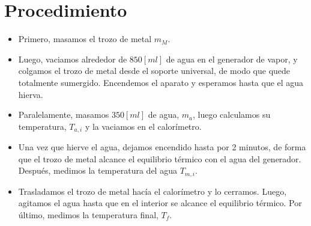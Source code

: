 \documentclass[a4paper, 12p]{article}
\begin{document}
\section{Procedimiento}

\begin{itemize}
      \item Primero, masamos el trozo de metal $m_M$.
      \item Luego, vaciamos alrededor de $850 [ml]$ de agua en el generador de vapor, y colgamos el trozo de metal desde el soporte universal,
      de modo que quede totalmente sumergido. Encendemos el aparato y esperamos hasta que el agua hierva.
      \item Paralelamente, masamos $350 [ml]$ de agua, $m_a$, luego calculamos su temperatura, $T_{a,i}$ y la vaciamos en el calorímetro. 
      \item Una vez que hierve el agua, dejamos encendido hasta por 2 minutos, de forma que el trozo de metal alcance el 
      equilibrio térmico con el agua del generador. Después, medimos la temperatura del agua $T_{m,i}$.
      \item Trasladamos el trozo de metal hacía el calorímetro y lo cerramos. Luego, agitamos el agua hasta que en el interior se 
      alcance el equilibrio térmico. Por último, medimos la temperatura final, $T_f$.
\end{itemize}
\end{document}
